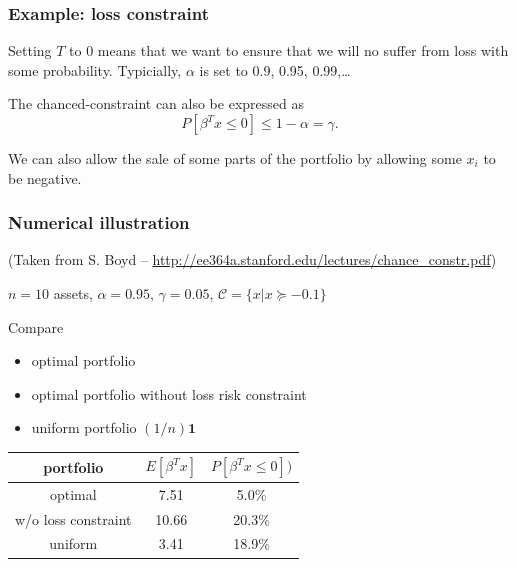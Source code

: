 \documentclass{beamer}
\begin{document}
\begin{frame}
\frametitle{Example: loss constraint}

Setting $T$ to 0 means that we want to ensure that we will no suffer from loss with some probability. Typicially, $\alpha$ is set to 0.9, 0.95, 0.99,\ldots

\mbox{}

The chanced-constraint can also be expressed as
\[
P\left[ \beta^T x \leq 0 \right] \leq 1-\alpha = \gamma.
\]

\mbox{}

We can also allow the sale of some parts of the portfolio by allowing some $x_i$ to be negative.
\end{frame}

\begin{frame}
\frametitle{Numerical illustration}

(Taken from S. Boyd -- \url{http://ee364a.stanford.edu/lectures/chance_constr.pdf})

$n = 10$ assets, $\alpha = 0.95$, $\gamma = 0.05$, $\mathcal{C} = \{x | x \succeq -0.1\}$

\mbox{}

Compare
\begin{itemize}
\item
optimal portfolio
\item
optimal portfolio without loss risk constraint
\item
uniform portfolio $(1/n)\mathbf{1}$
\end{itemize}

\mbox{}

\begin{center}
\begin{tabular}{c|c|c}
portfolio & $E[\beta^T x]$ & $P[\beta^T x \leq 0])$ \\
\hline
optimal & 7.51 & 5.0\% \\
w/o loss constraint & 10.66 & 20.3\% \\
uniform & 3.41 & 18.9\%
\end{tabular}
\end{center}

\end{frame}
\end{document}
